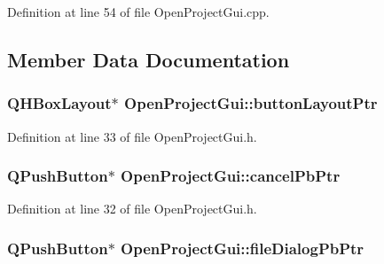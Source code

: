 Definition at line 54 of file Open\-Project\-Gui.\-cpp.



\subsection{Member Data Documentation}
\hypertarget{class_open_project_gui_abefeff15278c7240eaa8778d15ec21d7}{
\subsubsection[{button\-Layout\-Ptr}]{\setlength{\rightskip}{0pt plus 5cm}Q\-H\-Box\-Layout$\ast$ Open\-Project\-Gui\-::button\-Layout\-Ptr\hspace{0.3cm}{\ttfamily [private]}}}\label{class_open_project_gui_abefeff15278c7240eaa8778d15ec21d7}


Definition at line 33 of file Open\-Project\-Gui.\-h.

\hypertarget{class_open_project_gui_a9e9fc184375d14b4ed336470bc06ffb1}{
\subsubsection[{cancel\-Pb\-Ptr}]{\setlength{\rightskip}{0pt plus 5cm}Q\-Push\-Button$\ast$ Open\-Project\-Gui\-::cancel\-Pb\-Ptr\hspace{0.3cm}{\ttfamily [private]}}}\label{class_open_project_gui_a9e9fc184375d14b4ed336470bc06ffb1}


Definition at line 32 of file Open\-Project\-Gui.\-h.

\hypertarget{class_open_project_gui_affa5359b9b61f58f2b6681e5f0d0b243}{
\subsubsection[{file\-Dialog\-Pb\-Ptr}]{\setlength{\rightskip}{0pt plus 5cm}Q\-Push\-Button$\ast$ Open\-Project\-Gui\-::file\-Dialog\-Pb\-Ptr\hspace{0.3cm}{\ttfamily [private]}}}\label{class_open_project_gui_affa5359b9b61f58f2b6681e5f0d0b243}


